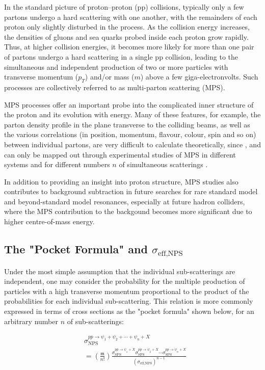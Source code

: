 \documentclass[10pt,twocolumn]{article}
\begin{document}
In the standard picture of proton–proton (pp) collisions, typically only a few partons undergo a hard scattering with one another, with the remainders of each proton only slightly disturbed in the process. As the collision energy increases, the densities of gluons and sea quarks probed inside each proton grow rapidly. Thus, at higher collision energies, it becomes more likely for more than one pair of partons undergo a hard scattering in a single pp collision, leading to the simultaneous and independent production of two or more particles with transverse momentum ($p_T$) and/or mass ($m$) above a few giga-electronvolts. Such processes are collectively referred to as multi-parton scattering (MPS).

MPS processes offer an important probe into the complicated inner structure of the proton and its evolution with energy.\cite{DIEHL_MPI}\cite{BLOK_MPS} Many of these features, for example, the parton density profile in the plane transverse to the colliding beams, as well as the various correlations (in position, momentum, flavour, colour, spin and so on) between individual partons, are very difficult to calculate theoretically, since , and can only be mapped out through experimental studies of MPS in different systems and for different numbers $n$ of simultaneous scatterings \cite{MPI_LHC}.

In addition to providing an insight into proton structure, MPS studies also contributes to background subtraction in future searches for rare standard model and beyond-standard model resonances, especially at future hadron colliders, where the MPS contribution to the backgound becomes more significant due to higher centre-of-mass energy.\cite{DdE_TPS}\cite{YJZ_TRI_JPSI}

\subsection{The "Pocket Formula" and $\sigma_{\text{eff,NPS}}$}

Under the most simple assumption that the individual sub-scatterings are independent, one may consider the probability for the multiple production of particles with a high transverse momentum proportional to the product of the probabilities for each individual sub-scattering. This relation is more commonly expressed in terms of cross sections as the "pocket formula" shown below, for an arbitrary number $n$ of sub-scatterings:

\begin{equation}
\begin{aligned}
    \label{eqn:nps_pocket}
    &\sigma^{pp\to\psi_1+\psi_2+\cdots+\psi_n+X}_{\text{NPS}} \\&=
    \left(\frac {\mathfrak{m}}{n!}\right) \frac{\sigma_{\text{SPS}}^{pp\to \psi_1+X}\sigma_{\text{SPS}}^{pp\to \psi_2+X}\cdots\sigma_{\text{SPS}}^{pp\to \psi_n+X}}{(\sigma_{\text{eff,NPS}})^{n-1}}
\end{aligned}
\end{equation}
\end{document}
